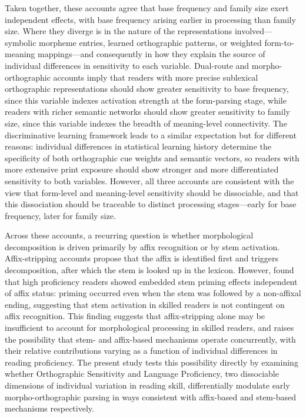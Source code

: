 \documentclass[utf8]{FrontiersinHarvard} %
\begin{document}
	Taken together, these accounts agree that base frequency and family size exert independent effects, with base frequency arising earlier in processing than family size. Where they diverge is in the nature of the representations involved---symbolic morpheme entries, learned orthographic patterns, or weighted form-to-meaning mappings---and consequently in how they explain the source of individual differences in sensitivity to each variable. Dual-route and morpho-orthographic accounts imply that readers with more precise sublexical orthographic representations should show greater sensitivity to base frequency, since this variable indexes activation strength at the form-parsing stage, while readers with richer semantic networks should show greater sensitivity to family size, since this variable indexes the breadth of meaning-level connectivity. The discriminative learning framework leads to a similar expectation but for different reasons: individual differences in statistical learning history determine the specificity of both orthographic cue weights and semantic vectors, so readers with more extensive print exposure should show stronger and more differentiated sensitivity to both variables. However, all three accounts are consistent with the view that form-level and meaning-level sensitivity should be dissociable, and that this dissociation should be traceable to distinct processing stages---early for base frequency, later for family size.
	
	Across these accounts, a recurring question is whether morphological decomposition is driven primarily by affix recognition or by stem activation. Affix-stripping accounts \citep{taft_lexical_1975, rastleMorphologicalDecompositionBased2008} propose that the affix is identified first and triggers decomposition, after which the stem is looked up in the lexicon. However, \citet{beyersmannEmbeddedStemPriming2016} found that high proficiency readers showed embedded stem priming effects independent of affix status: priming occurred even when the stem was followed by a non-affixal ending, suggesting that stem activation in skilled readers is not contingent on affix recognition. This finding suggests that affix-stripping alone may be insufficient to account for morphological processing in skilled readers, and raises the possibility that stem- and affix-based mechanisms operate concurrently, with their relative contributions varying as a function of individual differences in reading proficiency. The present study tests this possibility directly by examining whether Orthographic Sensitivity and Language Proficiency, two dissociable dimensions of individual variation in reading skill, differentially modulate early morpho-orthographic parsing in ways consistent with affix-based and stem-based mechanisms respectively.
	
\end{document}
